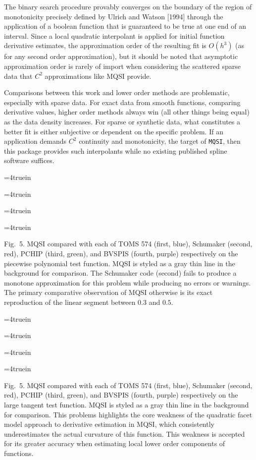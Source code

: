 The binary search procedure provably converges on the boundary of the
region of monotonicity precisely defined by Ulrich and Watson [1994]
through the application of a boolean function that is guaranteed to be
true at one end of an interval. Since a local quadratic interpolant is
applied for initial function derivative estimates, the approximation
order of the resulting fit is $O(h^3)$ (as for any second order
approximation), but it should be noted that asymptotic approximation
order is rarely of import when considering the scattered sparse data
that $C^2$ approximations like MQSI provide.

Comparisons between this work and lower order methods are problematic,
especially with sparse data. For exact data from smooth functions,
comparing derivative values, higher order methods always win (all
other things being equal) as the data density increases. For sparse or
synthetic data, what constitutes a better fit is either subjective or
dependent on the specific problem. If an application demands $C^2$
continuity and monotonicity, the target of {\tt MQSI}, then this
package provides such interpolants while no existing published spline
software suffices.

\topinsert
\centerline{\epsfxsize=4truein }
\centerline{\epsfxsize=4truein }
\centerline{\epsfxsize=4truein }
\centerline{\epsfxsize=4truein }
{\narrower\noindent\rmVIII Fig.\ 5.
{\ttVIII MQSI} compared with each of TOMS 574 (first, blue), Schumaker
(second, red), PCHIP (third, green), and BVSPIS (fourth, purple)
respectively on the {\itVIII piecewise polynomial} test function. MQSI
is styled as a gray thin line in the background for comparison. The
Schumaker code (second) fails to produce a monotone approximation for
this problem while producing no errors or warnings. The primary
comparative observation of MQSI otherwise is its exact reproduction of
the linear segment between $0.3$ and $0.5$.
\par}
\endinsert


\topinsert
\centerline{\epsfxsize=4truein }
\centerline{\epsfxsize=4truein }
\centerline{\epsfxsize=4truein }
\centerline{\epsfxsize=4truein }
{\narrower\noindent\rmVIII Fig.\ 5.
{\ttVIII MQSI} compared with each of TOMS 574 (first, blue), Schumaker
(second, red), PCHIP (third, green), and BVSPIS (fourth, purple)
respectively on the {\itVIII large tangent} test function. MQSI is
styled as a gray thin line in the background for comparison. This
problems highlights the core weakness of the quadratic facet model
approach to derivative estimation in MQSI, which consistently
underestimates the actual curvature of this function. This weakness is
accepted for its greater accuracy when estimating local lower order
components of functions.
\par}
\endinsert



